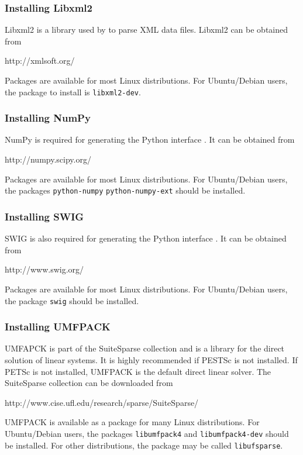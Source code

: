 \subsubsection{Installing Libxml2}

Libxml2 is a library used by \dolfin{} to parse XML data files. Libxml2 can be
obtained from
\begin{code}
http://xmlsoft.org/
\end{code}
Packages are available for most Linux distributions. For Ubuntu/Debian users, the 
package to install is \texttt{libxml2-dev}.


\subsubsection{Installing NumPy}

NumPy is required for generating the Python interface \pydolfin{}. 
It can be obtained from
\begin{code}
http://numpy.scipy.org/
\end{code}
Packages are available for most Linux distributions. For Ubuntu/Debian users,
the packages \texttt{python-numpy} \texttt{python-numpy-ext} should be installed.


\subsubsection{Installing SWIG}

SWIG is also required for generating the Python interface \pydolfin{}. 
It can be obtained from
\begin{code}
http://www.swig.org/
\end{code}
Packages are available for most Linux distributions. For Ubuntu/Debian users,
the package \texttt{swig} should be installed.


\subsubsection{Installing UMFPACK}

UMFAPCK is part of the SuiteSparse collection and is a library for the direct 
solution of linear systems. It is highly recommended if PESTSc is not installed. 
If PETSc is not installed, UMFPACK is the default direct linear solver.
The SuiteSparse collection can be downloaded from
\begin{code}
http://www.cise.ufl.edu/research/sparse/SuiteSparse/
\end{code}
UMFPACK is available as a package for many Linux distributions. For 
Ubuntu/Debian users, the packages \texttt{libumfpack4} and 
\texttt{libumfpack4-dev} should be installed. For other distributions, the package
may be called \texttt{libufsparse}.


